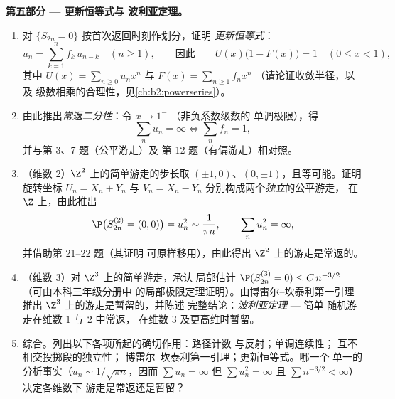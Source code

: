 \begin{problem}
\medskip
\noindent\textbf{第五部分 --- 更新恒等式与
波利亚定理。}
\begin{enumerate}[resume]
  \item 对 $\{S_{2n} = 0\}$ 按首次返回时刻作划分，证明
        \emph{更新恒等式}：
        \[
        u_n = \sum_{k=1}^n f_k\,u_{n-k} \quad (n \geq 1),
        \qquad\text{因此}\qquad
        U(x)\bigl(1 - F(x)\bigr) = 1 \quad (0 \leq x < 1),
        \]
        其中 $U(x) = \sum_{n\geq0}u_nx^n$ 与 $F(x) =
        \sum_{n\geq1}f_nx^n$ （请论证收敛半径，以及
        级数相乘的合理性，见\cref{ch:b2:powerseries}）。
  \item 由此推出\emph{常返二分性}：令 $x
        \to 1^-$ （非负系数级数的
        单调极限），得
        \[
        \sum_n u_n = \infty \iff \sum_n f_n = 1 ,
        \]
        并与第 3、7 题（公平游走）及
        第 12 题（有偏游走）相对照。
  \item （维数 $2$）$\Z^2$ 上的简单游走的步长取
        $(\pm1, 0)$、$(0, \pm1)$，且等可能。证明
        旋转坐标 $U_n = X_n + Y_n$ 与 $V_n = X_n
        - Y_n$ 分别构成两个\emph{独立}的公平游走，
        在 $\Z$ 上，由此推出
        \[
        \P\bigl(S^{(2)}_{2n} = (0,0)\bigr) = u_n^2 \sim
        \frac1{\pi n},
        \qquad \sum_n u_n^2 = \infty ,
        \]
        并借助第 21--22 题（其证明
        可原样移用），由此得出
        $\Z^2$ 上的游走是常返的。
  \item （维数 $3$）对 $\Z^3$ 上的简单游走，承认
        局部估计 $\P(S^{(3)}_{2n} = 0) \leq
        C\,n^{-3/2}$ （可由本科三年级分册中
        的局部极限定理证明）。由博雷尔--坎泰利第一引理推出
        $\Z^3$ 上的游走是暂留的，并陈述
        完整结论：\emph{波利亚定理} --- 简单
        随机游走在维数 $1$ 与 $2$ 中常返，
        在维数 $3$ 及更高维时暂留。
  \item 综合。列出以下各项所起的确切作用：路径计数
        与反射；单调连续性；
        互不相交投掷段的独立性；
        博雷尔--坎泰利第一引理；更新恒等式。哪一个
        单一的分析事实（$u_n \sim 1/\sqrt{\pi n}$，因而
        $\sum u_n = \infty$ 但 $\sum u_n^2 = \infty$ 且
        $\sum n^{-3/2} < \infty$）决定各维数下
        游走是常返还是暂留？
\end{enumerate}
\end{problem}
